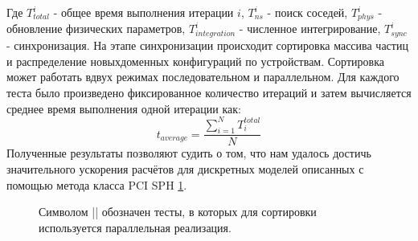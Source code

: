 Где \(T_{total}^{i}\) - общее время выполнения итерации \(i\), \(T_{ns}^{i}\) - поиск соседей, \(T_{phys}^{i}\) - обновление физических   параметров, \(T_{integration}^{i}\) - численное интегрирование, \(T_{sync}^{i}\) - синхронизация. На этапе синхронизации происходит сортировка массива частиц и распределение новыхдоменных конфигураций по устройствам. Сортировка может работать вдвух режимах  последовательном и параллельном. Для каждого теста было произведено фиксированное количество итераций и затем вычисляется среднее время выполнения одной итерации как:
\[
  t_{average} = \frac{\sum_{i=1}^{N}T_{i}^{total}}{N}
\]
Полученные результаты позволяют судить о том, что нам удалось достичь значительного ускорения расчётов для дискретных моделей описанных с помощью метода класса PCI SPH \ref{fig:result}.
\begin{figure}[ht]
  \caption{Символом || обозначен тесты, в которых для сортировки используется параллельная реализация.}\label{fig:result}
\end{figure}
